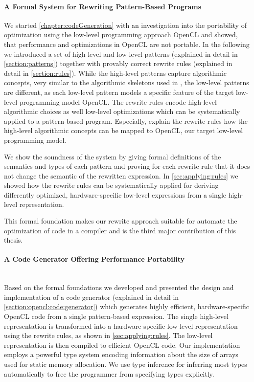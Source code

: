 \paragraph{A Formal System for Rewriting Pattern-Based Programs}
We started \autoref{chapter:codeGeneration} with an investigation into the portability of optimization using the low-level programming approach OpenCL and showed, that performance and optimizations in OpenCL are not portable.
In the following we introduced a set of high-level and low-level patterns (explained in detail in \autoref{section:patterns}) together with provably correct rewrite rules (explained in detail in \autoref{section:rules}).
While the high-level patterns capture algorithmic concepts, very similar to the algorithmic skeletons used in \SkelCL, the low-level patterns are different, as each low-level pattern models a specific feature of the target low-level programming model OpenCL.
The rewrite rules encode high-level algorithmic choices as well low-level optimizations which can be systematically applied to a pattern-based program.
Especially, explain the rewrite rules how the high-level algorithmic concepts can be mapped to OpenCL, our target low-level programming model.

We show the soundness of the system by giving formal definitions of the semantics and types of each pattern and proving for each rewrite rule that it does not change the semantic of the rewritten expression.
In \autoref{sec:applying:rules} we showed how the rewrite rules can be systematically applied for deriving differently optimized, hardware-specific low-level expressions from a single high-level representation.

\bigskip
This formal foundation makes our rewrite approach suitable for automate the optimization of code in a compiler and is the third major contribution of this thesis.

\paragraph{A Code Generator Offering Performance Portability}\hfill\\
Based on the formal foundations we developed and presented the design and implementation of a code generator (explained in detail in \autoref{section:opencl:code:generator}) which generates highly efficient, hardware-specific OpenCL code from a single pattern-based expression.
The single high-level representation is transformed into a hardware-specific low-level representation using the rewrite rules, as shown in \autoref{sec:applying:rules}.
The low-level representation is then compiled to efficient OpenCL code.
Our implementation employs a powerful type system encoding information about the size of arrays used for static memory allocation.
We use type inference for inferring most types automatically to free the programmer from specifying types explicitly.

